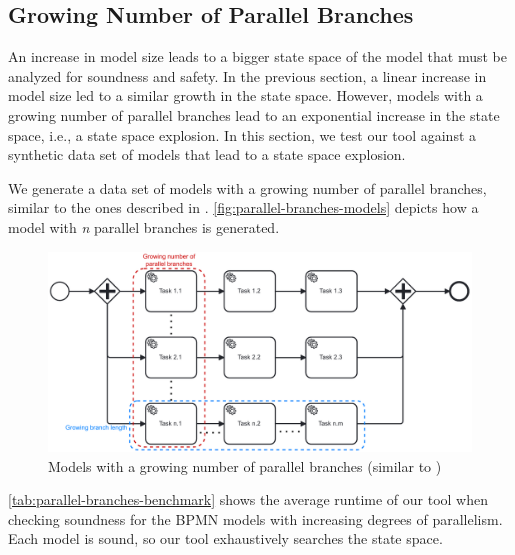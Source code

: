 \documentclass[runningheads]{llncs}
\begin{document}
\subsection{Growing Number of Parallel Branches} \label{subsec:degrees-of-parallelism}
An increase in model size leads to a bigger state space of the model that must be analyzed for soundness and safety.
In the previous section, a linear increase in model size led to a similar growth in the state space.
However, models with a growing number of parallel branches lead to an exponential increase in the state space, i.e., a state space explosion.
In this section, we test our tool against a synthetic data set of models that lead to a state space explosion.

We generate a data set of models with a growing number of parallel branches, similar to the ones described in \cite{corradiniFormalApproachAnalysis2021}.
\autoref{fig:parallel-branches-models} depicts how a model with \textit{n} parallel branches is generated.

\begin{figure}[ht]
	\centering
	\includegraphics[width=1\textwidth]{images/parallel-branches}
	\caption{Models with a growing number of parallel branches (similar to \cite{corradiniFormalApproachAnalysis2021})}
	\label{fig:parallel-branches-models}
\end{figure}


\autoref{tab:parallel-branches-benchmark} shows the average runtime of our tool when checking soundness for the BPMN models with increasing degrees of parallelism.
Each model is sound, so our tool exhaustively searches the state space.

\end{document}
